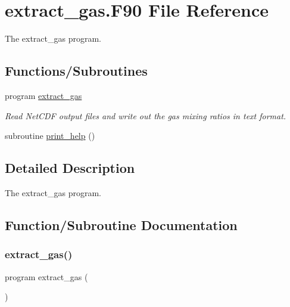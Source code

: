 \hypertarget{extract__gas_8_f90}{}\section{extract\+\_\+gas.\+F90 File Reference}
\label{extract__gas_8_f90}


The extract\+\_\+gas program.  


\subsection*{Functions/\+Subroutines}
\begin{DoxyCompactItemize}
\item 
program \mbox{\hyperlink{extract__gas_8_f90_a173147327de87197d9f4d2df6f38b483}{extract\+\_\+gas}}
\begin{DoxyCompactList}\small\item\em Read Net\+C\+DF output files and write out the gas mixing ratios in text format. \end{DoxyCompactList}\item 
subroutine \mbox{\hyperlink{extract__gas_8_f90_a1b81e33499016217dd603ff8e06d42bf}{print\+\_\+help}} ()
\end{DoxyCompactItemize}


\subsection{Detailed Description}
The extract\+\_\+gas program. 



\subsection{Function/\+Subroutine Documentation}
\mbox{\label{extract__gas_8_f90_a173147327de87197d9f4d2df6f38b483}} 
\subsubsection{\texorpdfstring{extract\+\_\+gas()}{extract\_gas()}}
{\footnotesize\ttfamily program extract\+\_\+gas (\begin{DoxyParamCaption}{ }\end{DoxyParamCaption})}



